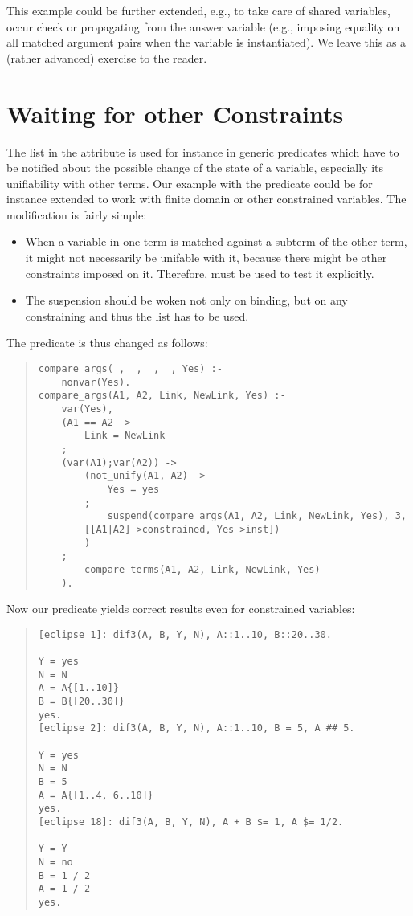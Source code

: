 This example could be further extended, e.g., to take care of shared
variables, occur check or propagating from the answer variable
(e.g., imposing equality on all matched argument pairs when the
variable  is instantiated).
We leave this as a (rather advanced) exercise to the reader.

\section{Waiting for other Constraints}
The  list in the  attribute
is used for instance in generic predicates which have to be
notified about the possible change of the state of a variable,
especially its unifiability with other terms.
Our example with the  predicate could be for instance
extended to work with finite domain or other constrained
variables.
The modification is fairly simple:
\begin{itemize}
\item When a variable in one term is matched against a subterm of the
other term, it might not necessarily be unifable with it, because
there might be other constraints imposed on it.
Therefore,  must
be used to test it explicitly.

\item The suspension should be woken not only on binding, but
on any constraining and thus the  list
has to be used.
\end{itemize}

The predicate  is thus changed as follows:
\begin{quote}
\begin{verbatim}
compare_args(_, _, _, _, Yes) :-
    nonvar(Yes).
compare_args(A1, A2, Link, NewLink, Yes) :-
    var(Yes),
    (A1 == A2 ->
        Link = NewLink
    ;
    (var(A1);var(A2)) ->
        (not_unify(A1, A2) ->
            Yes = yes
        ;
            suspend(compare_args(A1, A2, Link, NewLink, Yes), 3,
		[[A1|A2]->constrained, Yes->inst])
        )
    ;
        compare_terms(A1, A2, Link, NewLink, Yes)
    ).
\end{verbatim}
\end{quote}

Now our  predicate yields correct results even for
constrained variables:
\begin{quote}
\begin{verbatim}
[eclipse 1]: dif3(A, B, Y, N), A::1..10, B::20..30.

Y = yes
N = N
A = A{[1..10]}
B = B{[20..30]}
yes.
[eclipse 2]: dif3(A, B, Y, N), A::1..10, B = 5, A ## 5.

Y = yes
N = N
B = 5
A = A{[1..4, 6..10]}
yes.
[eclipse 18]: dif3(A, B, Y, N), A + B $= 1, A $= 1/2.

Y = Y
N = no
B = 1 / 2
A = 1 / 2
yes.

\end{verbatim}
\end{quote}

